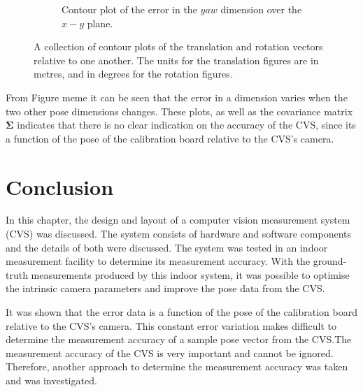 \begin{figure}
\begin{subfigure}{0.31\textwidth}
    \caption{Contour plot of the error in the $yaw$ dimension over the $x-y$ plane.}
  \end{subfigure}
  \caption[A collection of contour plots of the translation and rotation vectors relative to one another]{A collection of contour plots of the translation and rotation vectors relative to one another. The units for the translation figures are in metres, and in degrees for the rotation figures. }
  \label{fig:err-contour}
\end{figure}

From Figure meme it can be seen that the error in a dimension varies when the two other pose dimensions changes. These plots, as well as the covariance matrix $\bm{\Sigma}$ indicates that there is no clear indication on the accuracy of the CVS, since its a function of the pose of the calibration board relative to the CVS's camera. 

\section{Conclusion}

In this chapter, the design and layout of a computer vision measurement system (CVS) was discussed. The system consists of hardware and software components and the details of both were discussed. The system was tested in an indoor measurement facility to determine its measurement accuracy. With the ground-truth measurements produced by this indoor system, it was possible to optimise the intrinsic camera parameters and improve the pose data from the CVS.

It was shown that the error data is a function of the pose of the calibration board relative to the CVS's camera. This constant error variation makes difficult to determine the measurement accuracy of a sample pose vector from the CVS.\@ The measurement accuracy of the CVS is very important and cannot be ignored. Therefore, another approach to determine the measurement accuracy was taken and was investigated. 
